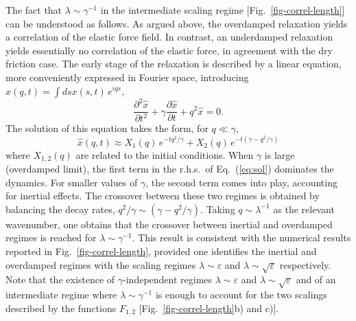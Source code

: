 \documentclass[prl,twocolumn,floats,floatfix,aps,superscriptaddress,showpacs]{revtex4-1}
\newcommand{\be}{\begin{equation}}
\newcommand{\ee}{\end{equation}}
\newcommand{\ve}{\varepsilon}
\begin{document}
The fact that $\lambda \sim \gamma^{-1}$ in the intermediate scaling regime
[Fig.~\ref{fig-correl-length}] can be understood as follows. As argued above, the overdamped relaxation yields a correlation of the elastic force field. In contrast, an underdamped relaxation yields essentially no correlation of the elastic force, in agreement with the dry friction case.
The early stage of the relaxation is described by a linear equation, more conveniently expressed in Fourier space, introducing
$\hat{x}(q,t)=\int ds x(s,t)\, e^{iqs}$,
\be
\frac{\partial^2 \hat{x}}{\partial t^2}
+ \gamma \frac{\partial \hat{x}}{\partial t}
+ q^2 \hat{x}=0.
\ee
The solution of this equation takes the form, for $q \ll \gamma$,
\be \label{eq:sol}
\hat{x}(q,t) \approx X_1(q)\, e^{-tq^2/\gamma} + X_2(q)\, e^{-t (\gamma-q^2/\gamma)}
\ee
where $X_{1,2}(q)$ are related to the initial conditions.
When $\gamma$ is large (overdamped limit), the first term in the r.h.s.~of
Eq.~(\ref{eq:sol}) dominates the dynamics. For smaller values of $\gamma$, the second term comes into play, accounting for inertial effects.
The crossover between these two regimes is obtained by balancing the decay
rates, $q^2/\gamma \sim (\gamma-q^2/\gamma)$.
Taking $q \sim \lambda^{-1}$ as the relevant wavenumber, one obtains
that the crossover between inertial and overdamped regimes is reached for $\lambda \sim \gamma^{-1}$. This result is consistent with the numerical results reported in Fig.~\ref{fig-correl-length}, provided one identifies the inertial and overdamped regimes with the scaling regimes $\lambda \sim \ve$ and $\lambda \sim \sqrt{\ve}$ respectively.
Note that the existence of $\gamma$-independent regimes $\lambda \sim \ve$ and $\lambda \sim \sqrt{\ve}$ and of an intermediate regime where $\lambda \sim \gamma^{-1}$ is enough to account for the two scalings described by the functions
$F_{1,2}$ [Fig.~\ref{fig-correl-length}b) and c)].
\end{document}
